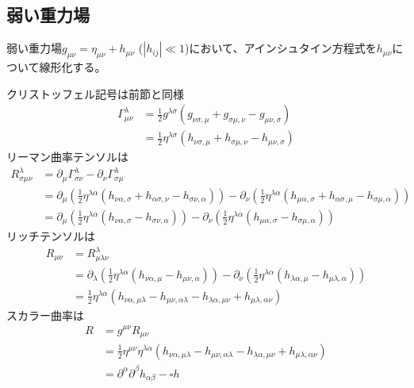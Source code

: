 \subsection{弱い重力場}
    弱い重力場$g_{\mu\nu} = \eta_{\mu\nu} + h_{\mu\nu}$ ($|h_{ij}| \ll 1$)において、アインシュタイン方程式を$h_{\mu\nu}$について線形化する。

    クリストッフェル記号は前節と同様
    \begin{align*}
        \Gamma^\lambda_{\mu\nu}
            &= \frac{1}{2}g^{\lambda\sigma}(g_{\nu\sigma, \mu} + g_{\sigma\mu, \nu} - g_{\mu\nu, \sigma})\\
            &= \frac{1}{2}\eta^{\lambda\sigma}(h_{\nu\sigma, \mu} + h_{\sigma\mu, \nu} - h_{\mu\nu, \sigma})
    \end{align*}
    リーマン曲率テンソルは
    \begin{align*}
        R^\lambda_{\sigma\mu\nu}
            &= \partial_\mu \Gamma^\lambda_{\sigma\nu} - \partial_\nu \Gamma^\lambda_{\sigma\mu}\\
            &= \partial_\mu\left(\frac{1}{2}\eta^{\lambda\alpha}(h_{\nu\alpha, \sigma} + h_{\alpha\sigma, \nu} - h_{\sigma\nu, \alpha})\right) - \partial_\nu\left(\frac{1}{2}\eta^{\lambda\alpha}(h_{\mu\alpha, \sigma} + h_{\alpha\sigma, \mu} - h_{\sigma\mu, \alpha})\right)\\
            &= \partial_\mu\left(\frac{1}{2}\eta^{\lambda\alpha}(h_{\nu\alpha, \sigma} - h_{\sigma\nu, \alpha})\right) - \partial_\nu\left(\frac{1}{2}\eta^{\lambda\alpha}(h_{\mu\alpha, \sigma} - h_{\sigma\mu, \alpha})\right)
    \end{align*}
    リッチテンソルは
    \begin{align*}
        R_{\mu\nu}
            &= R^\lambda_{\mu\lambda\nu}\\
            &= \partial_\lambda\left(\frac{1}{2}\eta^{\lambda\alpha}(h_{\nu\alpha, \mu} - h_{\mu\nu, \alpha})\right) - \partial_\nu\left(\frac{1}{2}\eta^{\lambda\alpha}(h_{\lambda\alpha, \mu} - h_{\mu\lambda, \alpha})\right)\\
            &= \frac{1}{2}\eta^{\lambda\alpha}(h_{\nu\alpha, \mu\lambda} - h_{\mu\nu, \alpha\lambda} - h_{\lambda\alpha, \mu\nu} + h_{\mu\lambda, \alpha\nu})
    \end{align*}
    スカラー曲率は
    \begin{align*}
        R   &= g^{\mu\nu}R_{\mu\nu}\\
            &= \frac{1}{2}\eta^{\mu\nu}\eta^{\lambda\alpha}(h_{\nu\alpha, \mu\lambda} - h_{\mu\nu, \alpha\lambda} - h_{\lambda\alpha, \mu\nu} + h_{\mu\lambda, \alpha\nu})\\
            &= \partial^\alpha \partial^\beta h_{\alpha\beta} - \square h
    \end{align*}
